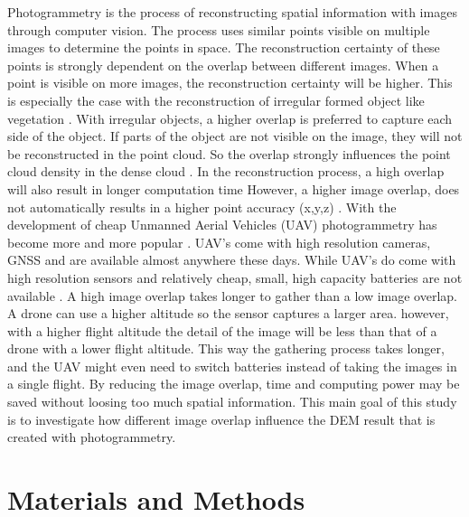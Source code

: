 \documentclass{isprs} %
\begin{document}
Photogrammetry is the process of reconstructing spatial information with images through computer vision. 
The process uses similar points visible on multiple images to determine the points in space.
The reconstruction certainty of these points is strongly dependent on the overlap between different images. 
When a point is visible on more images, the reconstruction certainty will be higher.
This is especially the case with the reconstruction of irregular formed object like vegetation \citep{AccessingImageOverlap}.
With irregular objects, a higher overlap is preferred to capture each side of the object.
If parts of the object are not visible on the image, they will not be reconstructed in the point cloud.
So the overlap strongly influences the point cloud density in the dense cloud \citep{OptimalAltOverWeath}.
In the reconstruction process, a high overlap will also result in longer computation time \citep{AccessingImageOverlap}
However, a higher image overlap, does not automatically results in a higher point accuracy (x,y,z) \citep{EffectofUABimgcamover}. 
With the development of cheap Unmanned Aerial Vehicles (UAV) photogrammetry has become more and more popular \citet{UAVAreMoreUsed}. 
UAV's come with high resolution cameras, GNSS and are available almost anywhere these days.
While UAV's do come with high resolution sensors and relatively cheap, small, high capacity batteries are not available \citep{UAVpopularity}.
A high image overlap takes longer to gather than a low image overlap. 
A drone can use a higher altitude so the sensor captures a larger area.
however, with a higher flight altitude the detail of the image will be less than that of a drone with a lower flight altitude.
This way the gathering process takes longer, and the UAV might even need to switch batteries instead of taking the images in a single flight.
By reducing the image overlap, time and computing power may be saved without loosing too much spatial information.
This main goal of this study is to investigate how different image overlap influence the DEM result that is created with photogrammetry. 


\section{Materials and Methods}
\end{document}
